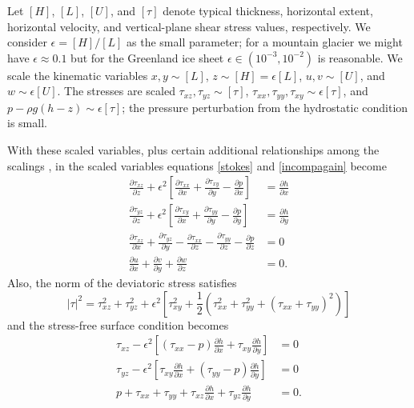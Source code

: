 \documentclass[letterpaper,final,12pt,reqno]{amsart}
\newcommand{\eps}{\epsilon}
\begin{document}
Let $[H]$, $[L]$, $[U]$, and $[\tau]$ denote typical thickness, horizontal extent, horizontal velocity, and vertical-plane shear stress values, respectively.  We consider $\eps = [H]/[L]$ as the small parameter; for a mountain glacier we might have $\eps \approx 0.1$ but for the Greenland ice sheet $\eps \in (10^{-3},10^{-2})$ is reasonable.  We scale the kinematic variables $x,y \sim [L]$, $z \sim [H] = \eps [L]$, $u,v \sim [U]$, and $w \sim \eps [U]$.  The stresses are scaled $\tau_{xz},\tau_{yz}\sim [\tau]$, $\tau_{xx},\tau_{yy},\tau_{xy}\sim \eps[\tau]$, and $p-\rho g (h - z) \sim \eps [\tau]$; the pressure perturbation from the hydrostatic condition is small.

With these scaled variables, plus certain additional relationships among the scalings \cite[Chapter 18]{Fowler1997}, in the scaled variables equations \eqref{stokes} and \eqref{incompagain} become
\begin{align*}
\frac{\partial\tau_{xz}}{\partial z} + \eps^2\left[\frac{\partial\tau_{xx}}{\partial x} +\frac{\partial\tau_{xy}}{\partial y} - \frac{\partial p}{\partial x}\right] &= \frac{\partial h}{\partial x} \\
\frac{\partial\tau_{yz}}{\partial z} + \eps^2\left[\frac{\partial\tau_{xy}}{\partial x} +\frac{\partial\tau_{yy}}{\partial y} - \frac{\partial p}{\partial y}\right] &= \frac{\partial h}{\partial y} \\
\frac{\partial\tau_{xz}}{\partial x} + \frac{\partial\tau_{yz}}{\partial y} -\frac{\partial\tau_{xx}}{\partial z} - \frac{\partial\tau_{yy}}{\partial z} - \frac{\partial p}{\partial z} &= 0 \\
\frac{\partial u}{\partial x} + \frac{\partial v}{\partial y} + \frac{\partial w}{\partial z} &= 0.
\end{align*}
Also, the norm of the deviatoric stress satisfies
    $$|\tau|^2 = \tau_{xz}^2 + \tau_{yz}^2 + \eps^2 \left[\tau_{xy}^2 + \frac{1}{2} \left(\tau_{xx}^2 + \tau_{yy}^2 + (\tau_{xx} + \tau_{yy})^2\right)\right]$$
and the stress-free surface condition becomes
\begin{align*}
\tau_{xz} - \eps^2\left[(\tau_{xx}-p) \frac{\partial h}{\partial x} + \tau_{xy} \frac{\partial h}{\partial y} \right] &= 0 \\
\tau_{yz} - \eps^2\left[\tau_{xy} \frac{\partial h}{\partial x} + (\tau_{yy}-p) \frac{\partial h}{\partial y}\right] &= 0 \\
p + \tau_{xx} + \tau_{yy} + \tau_{xz} \frac{\partial h}{\partial x} + \tau_{yz} \frac{\partial h}{\partial y} &= 0.
\end{align*}
\end{document}
